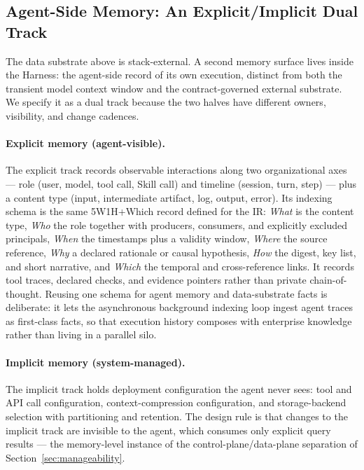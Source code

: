 \documentclass[11pt]{article}
\begin{document}
\subsection{Agent-Side Memory: An Explicit/Implicit Dual Track}
\label{sec:memory-dualtrack}

The data substrate above is stack-external. A second memory surface lives inside the Harness: the agent-side record of its own execution, distinct from both the transient model context window and the contract-governed external substrate. We specify it as a dual track because the two halves have different owners, visibility, and change cadences.

\paragraph{Explicit memory (agent-visible).}
The explicit track records observable interactions along two organizational axes --- role (user, model, tool call, Skill call) and timeline (session, turn, step) --- plus a content type (input, intermediate artifact, log, output, error). Its indexing schema is the same 5W1H+Which record defined for the IR: \textit{What} is the content type, \textit{Who} the role together with producers, consumers, and explicitly excluded principals, \textit{When} the timestamps plus a validity window, \textit{Where} the source reference, \textit{Why} a declared rationale or causal hypothesis, \textit{How} the digest, key list, and short narrative, and \textit{Which} the temporal and cross-reference links. It records tool traces, declared checks, and evidence pointers rather than private chain-of-thought. Reusing one schema for agent memory and data-substrate facts is deliberate: it lets the asynchronous background indexing loop ingest agent traces as first-class facts, so that execution history composes with enterprise knowledge rather than living in a parallel silo.

\paragraph{Implicit memory (system-managed).}
The implicit track holds deployment configuration the agent never sees: tool and API call configuration, context-compression configuration, and storage-backend selection with partitioning and retention. The design rule is that changes to the implicit track are invisible to the agent, which consumes only explicit query results --- the memory-level instance of the control-plane/data-plane separation of Section~\ref{sec:manageability}.
\end{document}
